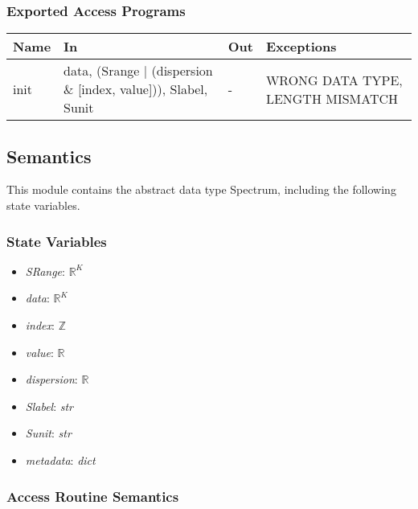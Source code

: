\documentclass[12pt, titlepage]{article}
\begin{document}
\subsubsection{Exported Access Programs}

\begin{center}
\begin{tabular}{p{1.5cm} p{4cm} p{4cm} p{4cm}}
\toprule
\textbf{Name} & \textbf{In} & \textbf{Out} & \textbf{Exceptions} \\
\midrule
init & data, (Srange $|$ (dispersion $\&$ [index, value])), Slabel, Sunit & - & WRONG DATA TYPE, LENGTH MISMATCH \\
\bottomrule
\end{tabular}
\end{center}

\subsection{Semantics}
This module contains the abstract data type Spectrum, including the following state variables.
\subsubsection{State Variables}
\begin{itemize}
\item \textit{SRange}: $\mathbb{R}^K$
\item \textit{data}: $\mathbb{R}^K$
\item \textit{index}: $\mathbb{Z}$
\item \textit{value}: $\mathbb{R}$
\item \textit{dispersion}: $\mathbb{R}$
\item \textit{Slabel}: \textit{str}
\item \textit{Sunit}: \textit{str}
\item \textit{metadata}: \textit{dict}
\end{itemize}

\subsubsection{Access Routine Semantics}
\end{document}
